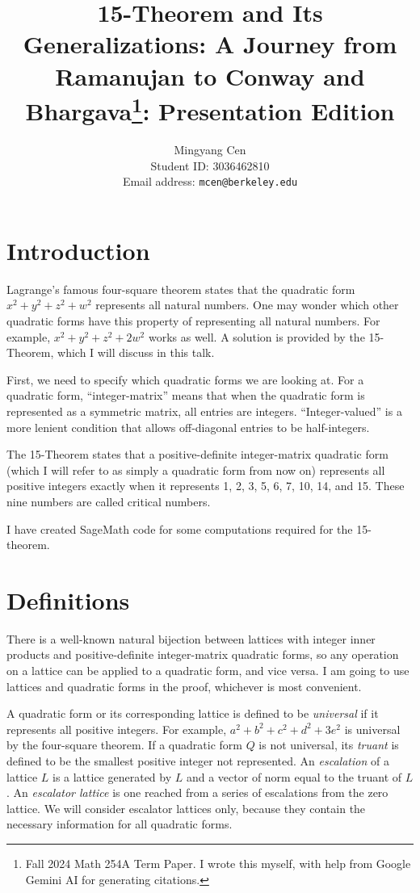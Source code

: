\documentclass[letterpaper, 12pt]{article}
\title{15-Theorem and Its Generalizations: A Journey from Ramanujan to Conway and Bhargava\footnote{Fall 2024 Math 254A Term Paper. I wrote this myself, with help from Google Gemini AI for generating citations.}: Presentation Edition}
\author{Mingyang Cen \\ Student ID: 3036462810 \\ Email address: \texttt{mcen@berkeley.edu}}
\begin{document}
\maketitle

\section{Introduction}
Lagrange's famous four-square theorem states that the quadratic form $x^2+y^2+z^2+w^2$ represents all natural numbers. One may wonder which other quadratic forms have this property of representing all natural numbers. For example, $x^2 + y^2 + z^2 + 2w^2$ works as well. A solution is provided by the 15-Theorem, which I will discuss in this talk.

First, we need to specify which quadratic forms we are looking at. For a quadratic form, ``integer-matrix'' means that when the quadratic form is represented as a symmetric matrix, all entries are integers. ``Integer-valued'' is a more lenient condition that allows off-diagonal entries to be half-integers.

The 15-Theorem states that a positive-definite integer-matrix quadratic form (which I will refer to as simply a quadratic form from now on) represents all positive integers exactly when it represents 1, 2, 3, 5, 6, 7, 10, 14, and 15. These nine numbers are called critical numbers.

I have created SageMath code for some computations required for the 15-theorem.

\section{Definitions}
There is a well-known natural bijection between lattices with integer inner products and positive-definite integer-matrix quadratic forms, so any operation on a lattice can be applied to a quadratic form, and vice versa. I am going to use lattices and quadratic forms in the proof, whichever is most convenient.

A quadratic form or its corresponding lattice is defined to be \emph{universal} if it represents all positive integers. For example, $a^2+b^2+c^2+d^2+3e^2$ is universal by the four-square theorem. If a quadratic form $Q$ is not universal, its \emph{truant} is defined to be the smallest positive integer not represented. An \emph{escalation} of a lattice $L$ is a lattice generated by $L$ and a vector of norm equal to the truant of $L$. An \emph{escalator lattice} is one reached from a series of escalations from the zero lattice. We will consider escalator lattices only, because they contain the necessary information for all quadratic forms.
\end{document}
